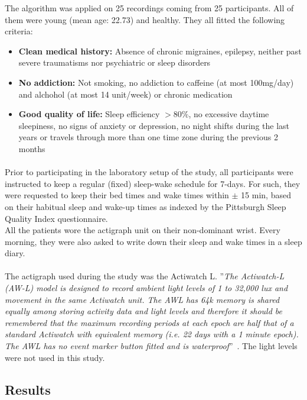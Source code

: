 \documentclass[a4paper,12pt]{article}
\begin{document}
The algorithm was applied on 25 recordings coming from 25 participants. All of them were young (mean age: 22.73) and healthy. They all fitted the following criteria:
\begin{itemize}
\item \textbf{Clean medical history:} Absence of chronic migraines, epilepsy, neither past severe traumatisms  nor psychiatric or sleep disorders
\item \textbf{No addiction:} Not smoking, no addiction to caffeine (at most 100mg/day) and alchohol (at most 14 unit/week) or chronic medication
\item \textbf{Good quality of life:} Sleep efficiency $> 80\%$, no excessive daytime sleepiness, no signs of anxiety or depression, no night shifts during the last years or travels through more than one time zone during the previous 2 months
\end{itemize}

\paragraph{}
Prior to participating in the laboratory setup of the study, all participants were instructed to keep a regular (fixed) sleep-wake schedule for 7-days. For such, they were requested to keep their bed times and wake times within $\pm$ 15 min, based on their habitual sleep and wake-up times as indexed by the Pittsburgh Sleep Quality Index questionnaire.\\

All the patients wore the actigraph unit on their non-dominant wrist. Every morning, they were also asked to write down their sleep and wake times in a sleep diary.

\paragraph{}
The actigraph used during the study was the Actiwatch L. ''\textit{The Actiwatch-L (AW-L) model is designed to record ambient light levels of 1 to 32,000 lux and movement in the same Actiwatch unit. The AWL has 64k memory is shared equally among storing activity data and light levels and therefore it should be remembered that the maximum recording periods at each epoch are half that of a standard Actiwatch with equivalent memory (i.e. 22 days with a 1 minute epoch). The AWL has no event marker button fitted and is waterproof}''~\cite{Ltd}. The light levels were not used in this study.

\subsection{Results}
\label{subsec:results}
\end{document}
